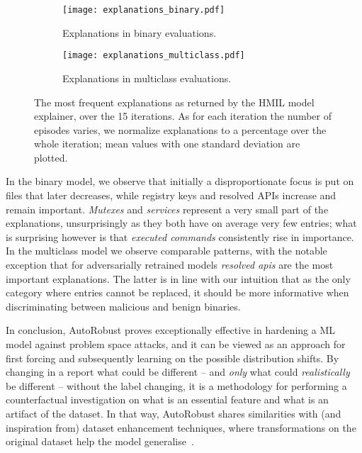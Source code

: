 \begin{figure*}
\centering
\begin{subfigure}{0.49\columnwidth}
  \centering
  \texttt{[image: explanations\_binary.pdf]}
  \caption{Explanations in binary evaluations.}

\end{subfigure}
\begin{subfigure}{0.49\columnwidth}
  \centering
  \texttt{[image: explanations\_multiclass.pdf]}
  \caption{Explanations in multiclass evaluations.}

\end{subfigure}
\caption[The most frequent explanations as returned by the HMIL model explainer.]{The most frequent explanations as returned by the HMIL model explainer, over the 15 iterations. As for each iteration the number of episodes varies, we normalize explanations to a percentage over the whole iteration; mean values with one standard deviation are plotted.}
\label{fig:explanations}
\end{figure*}

In the binary model, we observe that initially a disproportionate focus is put on files that later decreases, while registry keys and resolved APIs increase and remain important.
\textit{Mutexes} and \textit{services} represent a very small part of the explanations, unsurprisingly as they both have on average very few entries; what is surprising however is that \textit{executed commands} consistently rise in importance.
In the multiclass model we observe comparable patterns, with the notable exception that for adversarially retrained models \textit{resolved apis} are the most important explanations.
The latter is in line with our intuition that as the only category where entries cannot be replaced, it should be more informative when discriminating between malicious and benign binaries.

In conclusion, AutoRobust proves exceptionally effective in hardening a ML model against problem space attacks, and it can be viewed as an approach for first forcing and subsequently learning on the possible distribution shifts.
By changing in a report what could be different -- and \textit{only} what could \textit{realistically} be different -- without the label changing, it is a methodology for performing a counterfactual investigation on what is an essential feature and what is an artifact of the dataset.
In that way, AutoRobust shares similarities with (and inspiration from) dataset enhancement techniques, where transformations on the original dataset help the model generalise~\cite{cubuk2018autoaugment}.

